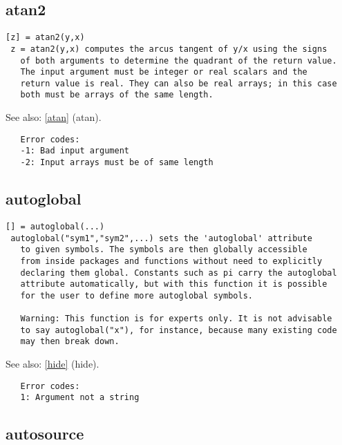 \documentclass[a4paper]{article}
\begin{document}
\subsection{atan2\label{atan2}}

\begin{tscreen}
\begin{verbatim}
[z] = atan2(y,x)
 z = atan2(y,x) computes the arcus tangent of y/x using the signs
   of both arguments to determine the quadrant of the return value.
   The input argument must be integer or real scalars and the
   return value is real. They can also be real arrays; in this case
   both must be arrays of the same length.
\end{verbatim}

See also: \ref{atan} {(atan)}.
\begin{verbatim}
   Error codes:
   -1: Bad input argument
   -2: Input arrays must be of same length
\end{verbatim}
\end{tscreen}





\subsection{autoglobal\label{autoglobal}}

\begin{tscreen}
\begin{verbatim}
[] = autoglobal(...)
 autoglobal("sym1","sym2",...) sets the 'autoglobal' attribute
   to given symbols. The symbols are then globally accessible
   from inside packages and functions without need to explicitly
   declaring them global. Constants such as pi carry the autoglobal
   attribute automatically, but with this function it is possible
   for the user to define more autoglobal symbols.

   Warning: This function is for experts only. It is not advisable
   to say autoglobal("x"), for instance, because many existing code
   may then break down.
\end{verbatim}

See also: \ref{hide} {(hide)}.
\begin{verbatim}
   Error codes:
   1: Argument not a string 
\end{verbatim}
\end{tscreen}





\subsection{autosource\label{autosource}}
\end{document}
